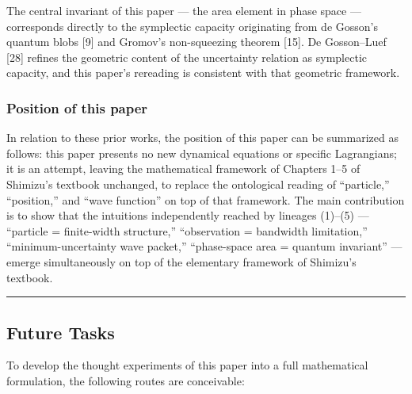 \documentclass[
]{article}
\begin{document}
The central invariant of this paper --- the area element in phase space
--- corresponds directly to the symplectic capacity originating from de
Gosson's quantum blobs {[}9{]} and Gromov's non-squeezing theorem
{[}15{]}. De Gosson--Luef {[}28{]} refines the geometric content of the
uncertainty relation as symplectic capacity, and this paper's rereading
is consistent with that geometric framework.

\subsubsection{Position of this paper}\label{position-of-this-paper}

In relation to these prior works, the position of this paper can be
summarized as follows: this paper presents no new dynamical equations or
specific Lagrangians; it is an attempt, leaving the mathematical
framework of Chapters 1--5 of Shimizu's textbook unchanged, to replace
the ontological reading of ``particle,'' ``position,'' and ``wave
function'' on top of that framework. The main contribution is to show
that the intuitions independently reached by lineages (1)--(5) ---
``particle = finite-width structure,'' ``observation = bandwidth
limitation,'' ``minimum-uncertainty wave packet,'' ``phase-space area =
quantum invariant'' --- emerge simultaneously on top of the elementary
framework of Shimizu's textbook.

\begin{center}\rule{0.5\linewidth}{0.5pt}\end{center}

\subsection{Future Tasks}\label{future-tasks}

To develop the thought experiments of this paper into a full
mathematical formulation, the following routes are conceivable:
\end{document}

